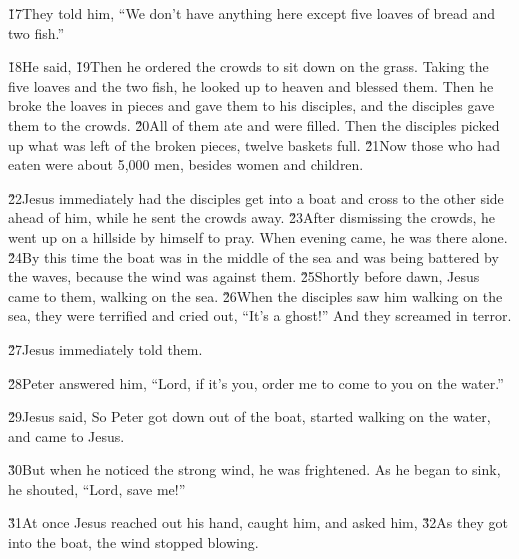 \v{17}They told him, ``We don't have anything here except five loaves of bread and two fish.''

\v{18}He said,  \v{19}Then he ordered the crowds to sit down on the grass. Taking the five loaves and the two fish, he looked up to heaven and blessed them. Then he broke the loaves in pieces and gave them to his disciples, and the disciples gave them to the crowds. \v{20}All of them ate and were filled. Then the disciples picked up what was left of the broken pieces, twelve baskets full. \v{21}Now those who had eaten were about 5,000 men, besides women and children.

\v{22}Jesus immediately had the disciples get into a boat and cross to the other side ahead of him, while he sent the crowds away. \v{23}After dismissing the crowds, he went up on a hillside by himself to pray. When evening came, he was there alone. \v{24}By this time the boat was in the middle of the sea and was being battered by the waves, because the wind was against them. \v{25}Shortly before dawn, Jesus came to them, walking on the sea. \v{26}When the disciples saw him walking on the sea, they were terrified and cried out, ``It's a ghost!'' And they screamed in terror.

\v{27}Jesus immediately told them. 

\v{28}Peter answered him, ``Lord, if it's you, order me to come to you on the water.''

\v{29}Jesus said,  So Peter got down out of the boat, started walking on the water, and came to Jesus.

\v{30}But when he noticed the strong wind, he was frightened. As he began to sink, he shouted, ``Lord, save me!''

\v{31}At once Jesus reached out his hand, caught him, and asked him,  \v{32}As they got into the boat, the wind stopped blowing.

